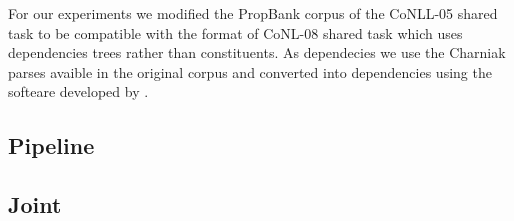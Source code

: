 

For our experiments we modified the PropBank corpus of the CoNLL-05 shared task \citep{carreras05introduction} to be compatible with the format of CoNL-08 shared task \citep{surdeanu08conll} which uses dependencies trees rather than constituents. As dependecies we use the Charniak parses avaible in the original corpus and converted into dependencies using the softeare developed by \citet{johansson07conversion}. 

\subsection{Pipeline}\label{sec:pipeline} 
 

\subsection{Joint}\label{sec:joint} 



